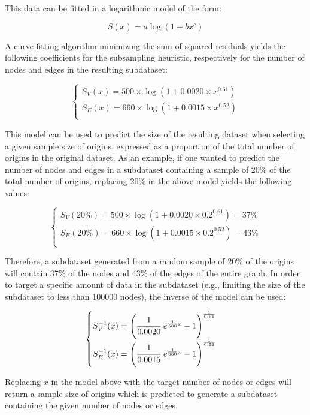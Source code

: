 This data can be fitted in a logarithmic model of the form:

\[S(x) = a \log(1+bx^c)\]

A curve fitting algorithm minimizing the sum of squared residuals yields the
following coefficients for the subsampling heuristic, respectively for the
number of nodes and edges in the resulting subdataset:

\[
\begin{cases}
    S_V(x) = 500 \times \log(1 + 0.0020 \times x ^{0.61}) \\
    S_E(x) = 660 \times \log(1 + 0.0015 \times x ^{0.52}) \\
\end{cases}
\]

This model can be used to predict the size of the resulting dataset when
selecting a given sample size of origins, expressed as a proportion of the
total number of origins in the original dataset. As an example, if one wanted
to predict the number of nodes and edges in a subdataset containing a sample of
20\% of the total number of origins, replacing 20\% in the above model
yields the following values:

\[
\begin{cases}
    S_V(20\%) = 500 \times \log(1 + 0.0020 \times 0.2 ^{0.61}) = 37\% \\
    S_E(20\%) = 660 \times \log(1 + 0.0015 \times 0.2 ^{0.52}) = 43\% \\
\end{cases}
\]

Therefore, a subdataset generated from a random sample of 20\% of the origins
will contain 37\% of the nodes and 43\% of the edges of the entire graph.
In order to target a specific amount of data in the subdataset (e.g., limiting
the size of the subdataset to less than \num{100000} nodes), the inverse of the
model can be used:

\[
\begin{cases}
    S_V^{-1}(x) = {\left(\cfrac{1}{0.0020}~e^{\frac{1}{500}x}-1\right)}^{\frac{1}{0.61}} \\
    S_E^{-1}(x) = {\left(\cfrac{1}{0.0015}~e^{\frac{1}{660}x}-1\right)}^{\frac{1}{0.52}} \\
\end{cases}
\]

Replacing $x$ in the model above with the target number of nodes or edges will
return a sample size of origins which is predicted to generate a subdataset
containing the given number of nodes or edges.

